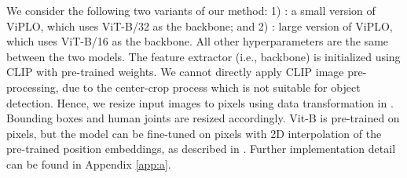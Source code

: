 \documentclass[10pt,twocolumn,letterpaper]{article}
\begin{document}
We consider the following two variants of our method: 1) : a small version of ViPLO, which uses ViT-B/32 as the backbone; and 2) : large version of ViPLO, which uses ViT-B/16 as the backbone. All other hyperparameters are the same between the two models. The feature extractor (i.e., backbone) is initialized using CLIP \cite{radford2021learning} with pre-trained weights. We cannot directly apply CLIP image pre-processing, due to the center-crop process which is not suitable for object detection. Hence, we resize input images to  pixels using data transformation in \cite{huang2020devil}. Bounding boxes and human joints are resized accordingly. Vit-B is pre-trained on  pixels, but the model can be fine-tuned on  pixels with 2D interpolation of the pre-trained position embeddings, as described in \cite{dosovitskiy2020image}. Further implementation detail can be found in Appendix \ref{app:a}.


\begin{table}[t]
\begin{center}
\end{center}
\vspace{-0.2in}
\caption{Performance comparison in terms of mAP on the HICO-DET dataset with ground truth detection results. The best result is marked in bold and the second best result is underlined.}
\label{tab:hicodet-res-gt}
\end{table}
\end{document}
